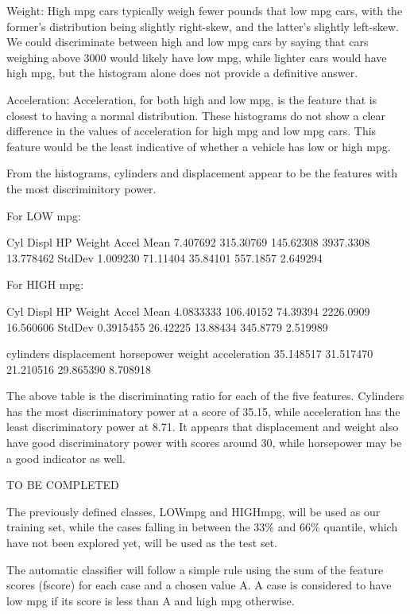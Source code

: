 \documentclass{homework}
\begin{document}
Weight: High mpg cars typically weigh fewer pounds that low mpg cars, with the former's distribution being slightly right-skew, and the latter's slightly left-skew. We could discriminate between high and low mpg cars by saying that cars weighing above 3000 would likely have low mpg, while lighter cars would have high mpg, but the histogram alone does not provide a definitive answer.

Acceleration: Acceleration, for both high and low mpg, is the feature that is closest to having a normal distribution. These histograms do not show a clear difference in the values of acceleration for high mpg and low mpg cars. This feature would be the least indicative of whether a vehicle has low or high mpg.

From the histograms, cylinders and displacement appear to be the features with the most discriminitory power.

\question
For LOW mpg:
\begin{rc}
            Cyl     Displ        HP    Weight     Accel
Mean   7.407692 315.30769 145.62308 3937.3308 13.778462
StdDev 1.009230  71.11404  35.84101  557.1857  2.649294
\end{rc}
For HIGH mpg:
\begin{rc}
             Cyl     Displ       HP    Weight     Accel
Mean   4.0833333 106.40152 74.39394 2226.0909 16.560606
StdDev 0.3915455  26.42225 13.88434  345.8779  2.519989
\end{rc}

\question
\begin{rc}
   cylinders displacement   horsepower       weight acceleration 
   35.148517    31.517470    21.210516    29.865390     8.708918 
\end{rc}
The above table is the discriminating ratio for each of the five features. Cylinders has the most discriminatory power at a score of 35.15, while acceleration has the least discriminatory power at 8.71. It appears that displacement and weight also have good discriminatory power with scores around 30, while horsepower may be a good indicator as well.

\question
TO BE COMPLETED

\question
The previously defined classes, LOWmpg and HIGHmpg, will be used as our training set, while the cases falling in between the 33\% and 66\% quantile, which have not been explored yet, will be used as the test set. 

The automatic classifier will follow a simple rule using the sum of the feature scores (fscore) for each case and a chosen value A. A case is considered to have low mpg if its score is less than A and high mpg otherwise. 
\end{document}
